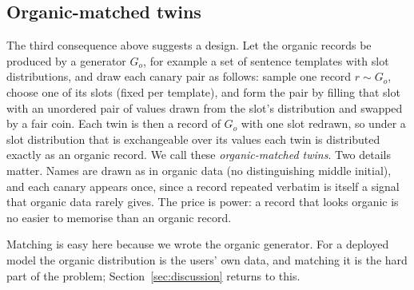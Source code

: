 \subsection{Organic-matched twins}\label{sec:matched}

The third consequence above suggests a design. Let the organic records be produced by a
generator $G_o$, for example a set of sentence templates with slot distributions, and
draw each canary pair as follows: sample one record $r\sim G_o$, choose one of its slots
(fixed per template), and form the pair by filling that slot with an unordered pair of
values drawn from the slot's distribution and swapped by a fair coin. Each twin is then
a record of $G_o$ with one slot redrawn, so under a slot distribution that is
exchangeable over its values each twin is distributed exactly as an organic record.
We call these \emph{organic-matched twins}. Two details matter. Names are drawn as
in organic data (no distinguishing middle initial), and each canary appears once, since
a record repeated verbatim is itself a signal that organic data rarely gives. The price
is power: a record that looks organic is no easier to memorise than an organic record.

Matching is easy here because we wrote the organic generator. For a deployed model the
organic distribution is the users' own data, and matching it is the hard part of the
problem; Section~\ref{sec:discussion} returns to this.
